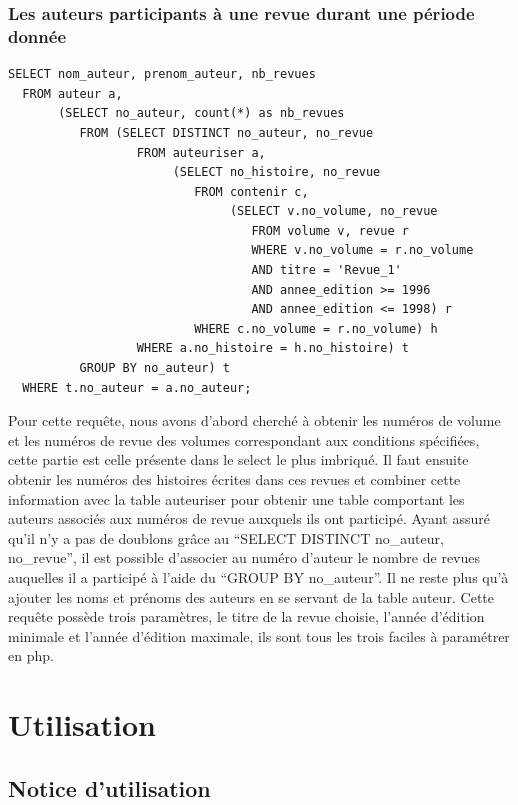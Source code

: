 \documentclass[12pt]{article}
\begin{document}
\subsubsection*{Les auteurs participants à une revue durant une période
donnée}
\begin{lstlisting}
SELECT nom_auteur, prenom_auteur, nb_revues
  FROM auteur a,
       (SELECT no_auteur, count(*) as nb_revues
          FROM (SELECT DISTINCT no_auteur, no_revue
                  FROM auteuriser a,
                       (SELECT no_histoire, no_revue
                          FROM contenir c,
                               (SELECT v.no_volume, no_revue
                                  FROM volume v, revue r
                                  WHERE v.no_volume = r.no_volume
                                  AND titre = 'Revue_1'
                                  AND annee_edition >= 1996
                                  AND annee_edition <= 1998) r
                          WHERE c.no_volume = r.no_volume) h
                  WHERE a.no_histoire = h.no_histoire) t
          GROUP BY no_auteur) t
  WHERE t.no_auteur = a.no_auteur;
\end{lstlisting}
Pour cette requête, nous avons d'abord cherché à obtenir les numéros de
volume et les numéros de revue des volumes correspondant aux conditions
spécifiées, cette partie est celle présente dans le select le plus imbriqué.
Il faut ensuite obtenir les numéros des histoires écrites dans ces revues et
combiner cette information avec la table auteuriser pour obtenir une table
comportant les auteurs associés aux numéros de revue auxquels ils ont
participé. Ayant assuré qu'il n'y a pas de doublons grâce au
``SELECT DISTINCT no\_auteur, no\_revue'', il est possible d'associer au
numéro d'auteur le nombre de revues auquelles il a participé à l'aide du
``GROUP BY no\_auteur''. Il ne reste plus qu'à ajouter les noms et prénoms
des auteurs en se servant de la table auteur. Cette requête possède trois
paramètres, le titre de la revue choisie, l'année d'édition minimale et
l'année d'édition maximale, ils sont tous les trois faciles à paramétrer en
php.


\section{Utilisation}

\subsection{Notice d'utilisation}
\end{document}
